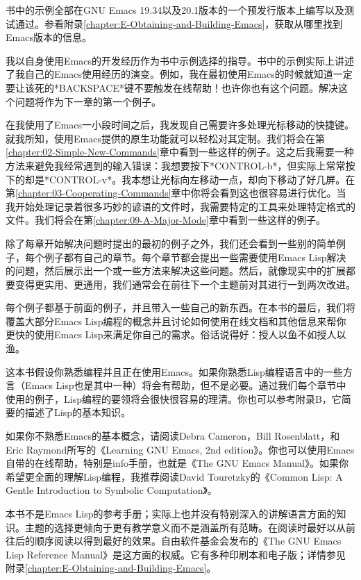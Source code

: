 书中的示例全部在GNU Emacs 19.34以及20.1版本的一个预发行版本上编写以及测试通过。参看附录\ref{chapter:E-Obtaining-and-Building-Emacs}，获取从哪里找到Emacs版本的信息。

我以自身使用Emacs的开发经历作为书中示例选择的指导。书中的示例实际上讲述了我自己的Emacs使用经历的演变。例如，我在最初使用Emacs的时候就知道一定要让该死的*BACKSPACE*键不要触发在线帮助！也许你也有这个问题。解决这个问题将作为下一章的第一个例子。

在我使用了Emacs一小段时间之后，我发现自己需要许多处理光标移动的快捷键。就我所知，使用Emacs提供的原生功能就可以轻松对其定制。我们将会在第\ref{chapter:02-Simple-New-Commands}章中看到一些这样的例子。这之后我需要一种方法来避免我经常遇到的输入错误：我想要按下*CONTROL-b*，但实际上常常按下的却是*CONTROL-v*。我本想让光标向左移动一点，却向下移动了好几屏。在第\ref{chapter:03-Cooperating-Commands}章中你将会看到这也很容易进行优化。当我开始处理记录着很多巧妙的谚语的文件时，我需要特定的工具来处理特定格式的文件。我们将会在第\ref{chapter:09-A-Major-Mode}章中看到一些这样的例子。

除了每章开始解决问题时提出的最初的例子之外，我们还会看到一些别的简单例子，每个例子都有自己的章节。每个章节都会提出一些需要使用Emacs Lisp解决的问题，然后展示出一个或一些方法来解决这些问题。然后，就像现实中的扩展都要变得更实用、更通用，我们通常会在前往下一个主题前对其进行一到两次改进。

每个例子都基于前面的例子，并且带入一些自己的新东西。在本书的最后，我们将覆盖大部分Emacs Lisp编程的概念并且讨论如何使用在线文档和其他信息来帮你更快的使用Emacs Lisp来满足你自己的需求。俗话说得好：授人以鱼不如授人以渔。

这本书假设你熟悉编程并且正在使用Emacs。如果你熟悉Lisp编程语言中的一些方言（Emacs Lisp也是其中一种）将会有帮助，但不是必要。通过我们每个章节中使用的例子，Lisp编程的要领将会很快很容易的理清。你也可以参考附录B，它简要的描述了Lisp的基本知识。

如果你不熟悉Emacs的基本概念，请阅读Debra Cameron，Bill Rosenblatt，和Eric Raymond所写的《Learning GNU Emacs, 2nd edition》。你也可以使用Emacs自带的在线帮助，特别是info手册，也就是《The GNU Emacs Manual》。如果你希望更全面的理解Lisp编程，我推荐阅读David Touretzky的《Common Lisp: A Gentle Introduction to Symbolic Computation》。

本书不是Emacs Lisp的参考手册；实际上也并没有特别深入的讲解语言方面的知识。主题的选择更倾向于更有教学意义而不是涵盖所有范畴。在阅读时最好以从前往后的顺序阅读以得到最好的效果。自由软件基金会发布的《The GNU Emacs Lisp Reference Manual》是这方面的权威。它有多种印刷本和电子版；详情参见附录\ref{chapter:E-Obtaining-and-Building-Emacs}。

